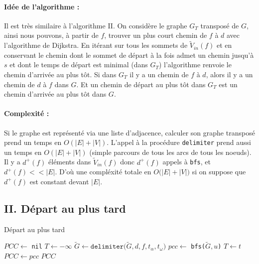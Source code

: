 \documentclass{article}
\begin{document}
\paragraph{Idée de l'algorithme : } Il est très similaire à l'algorithme II.
On considère le graphe $G_T$ transposé de $G$, ainsi nous pouvons, à partir de
$f$, trouver un plus court chemin de $f$ à $d$ avec l'algorithme de Dijkstra. En
itérant sur tous les sommets de $\tilde{V}_{in}(f)$ et en conservant le chemin
dont le sommet de départ à la fois admet un chemin jusqu'à $s$ et dont le temps
de départ est minimal (dans $G_T$) l'algorithme renvoie le chemin d'arrivée au plus
tôt. Si dans $G_T$ il y a un chemin de $f$ à $d$, alors il y a un chemin de $d$
à $f$ dans $G$. Et un chemin de départ au plus tôt dans $G_T$ est un chemin
d'arrivée au plus tôt dans $G$.
\paragraph{Complexité : } Si le graphe est représenté via une liste d'adjacence,
calculer son graphe transposé prend un temps en $O(|E|+|V|)$. L'appel à la
procédure \texttt{delimiter} prend aussi un temps en $O(|E|+|V|)$ (simple
parcours de tous les arcs de tous les noeuds). Il y a $d^+(f)$ éléments dans
$\tilde{V}_{in}(f)$ donc $d^+(f)$ appels à \texttt{bfs}, et $d^+(f) <<
|E|$. D'où une compléxité totale en
$O\big(|E|+|V|)$ si on suppose que $d^+(f)$ est constant devant $|E|$.


\subsection*{II. Départ au plus tard}
\begin{algorithm}[h]
\caption{Départ au plus tard}
\begin{algorithmic}[1]
    \State $PCC \leftarrow $ \texttt{nil} 
    \State $T \leftarrow -\infty$ 
    \State $\tilde{G} \leftarrow \texttt{delimiter($\tilde{G}, d, f, t_\alpha, t_\omega$)}$
        \State $pcc \leftarrow$ \texttt{bfs($\tilde{G}, u$)}
            \State $T \leftarrow t$
            \State $PCC \leftarrow pcc$
        \EndIf
    \EndFor
    \State \Return $PCC$
    \EndProcedure
    \end{algorithmic}
\end{algorithm}
\end{document}
